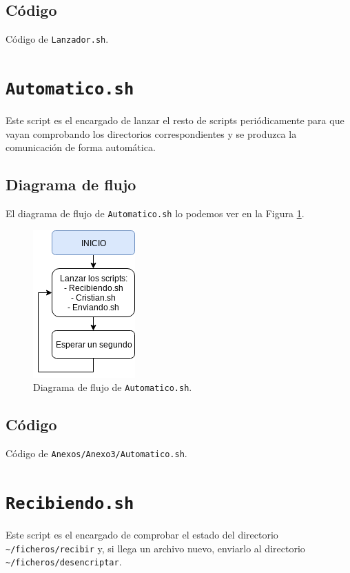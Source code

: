 \subsection{Código}

\begin{center}
	Código de \texttt{Lanzador.sh}.
\end{center}


\newpage
\section{\texttt{Automatico.sh}}
\hypertarget{ScriptAutomatico}{}
Este script es el encargado de lanzar el resto de scripts periódicamente para que vayan comprobando los directorios correspondientes y se produzca la comunicación de forma automática.

\subsection{Diagrama de flujo}
El diagrama de flujo de \texttt{Automatico.sh} lo podemos ver en la Figura \ref{Diagrama de flujo de Automatico.sh}.
\begin{figure}[h]
	\centering
	\includegraphics[scale=0.9]{Anexos/Anexo3/Diagramas/Automatico.png}
	\caption{Diagrama de flujo de \texttt{Automatico.sh}.}
	\label{Diagrama de flujo de Automatico.sh}
\end{figure}

\subsection{Código}

\begin{center}
	Código de \texttt{Anexos/Anexo3/Automatico.sh}.
\end{center}


\newpage
\section{\texttt{Recibiendo.sh}}
\hypertarget{ScriptRecibiendo}{}
Este script es el encargado de comprobar el estado del directorio \texttt{\textasciitilde/ficheros/recibir} y, si llega un archivo nuevo, enviarlo al directorio \texttt{\textasciitilde/ficheros/desencriptar}.

